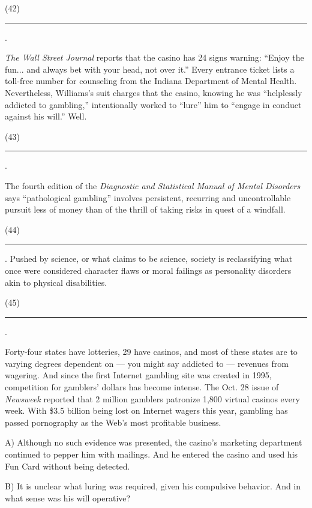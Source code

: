\documentclass[UTF8,11pt]{ctexart}
\begin{document}
(42) \par\noindent\rule{.95\linewidth}{.4pt}\par .


\textit{The Wall Street Journal} reports that the casino has 24 signs warning: “Enjoy the fun... and always bet with your head, not over it.” Every entrance ticket lists a toll-free number for counseling from the Indiana Department of Mental Health. Nevertheless, Williams’s suit charges that the casino, knowing he was “helplessly addicted to gambling,” intentionally worked to “lure” him to “engage in conduct against his will.” Well.


(43) \par\noindent\rule{.95\linewidth}{.4pt}\par .


The fourth edition of the \textit{Diagnostic and Statistical Manual of Mental Disorders} says “pathological gambling” involves persistent, recurring and uncontrollable pursuit less of money than of the thrill of taking risks in quest of a windfall.


(44) \par\noindent\rule{.95\linewidth}{.4pt}\par . Pushed by science, or what claims to be science, society is reclassifying what once were considered character flaws or moral failings as personality disorders akin to physical disabilities.


(45) \par\noindent\rule{.95\linewidth}{.4pt}\par .


Forty-four states have lotteries, 29 have casinos, and most of these states are to varying degrees dependent on — you might say addicted to — revenues from wagering. And since the first Internet gambling site was created in 1995, competition for gamblers’ dollars has become intense. The Oct. 28 issue of \textit{Newsweek} reported that 2 million gamblers patronize 1,800 virtual casinos every week. With \$3.5 billion being lost on Internet wagers this year, gambling has passed pornography as the Web’s most profitable business.


A) Although no such evidence was presented, the casino’s marketing department continued to pepper him with mailings. And he entered the casino and used his Fun Card without being detected.


B) It is unclear what luring was required, given his compulsive behavior. And in what sense was his will operative?
\end{document}
